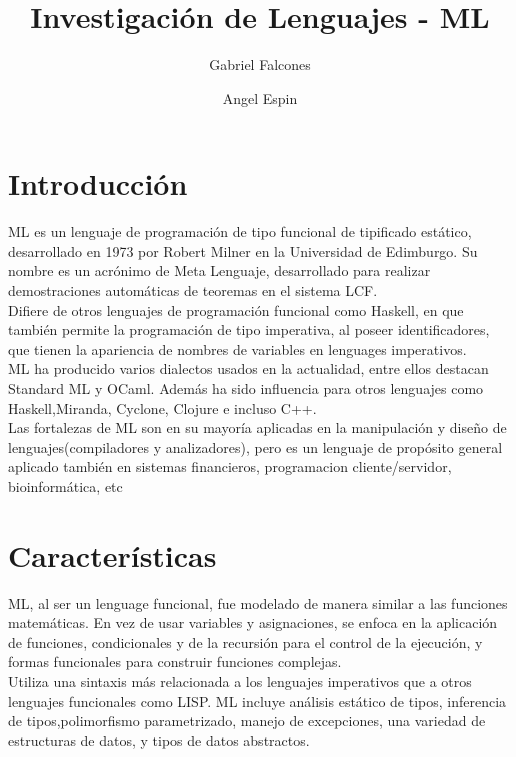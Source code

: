 \documentclass[11pt]{article} %
\title{\color{red}Investigación de Lenguajes - ML}
\author{Gabriel Falcones\and Angel Espin}
\begin{document}
\maketitle


\section{\color{red}Introducción}
ML es un lenguaje de programación de tipo funcional de tipificado estático, desarrollado en 1973 por Robert Milner en la Universidad de Edimburgo. Su nombre es un acrónimo de Meta Lenguaje, desarrollado para realizar demostraciones automáticas de teoremas en el sistema LCF.\\

Difiere de otros lenguajes de programación funcional como Haskell, en que también permite la programación de tipo imperativa, al poseer identificadores, que tienen la apariencia de nombres de variables en lenguages imperativos.\\

ML ha producido varios dialectos usados en la actualidad, entre ellos destacan Standard ML y OCaml. Además ha sido influencia para otros lenguajes como Haskell,Miranda, Cyclone, Clojure e incluso C++.\\

Las fortalezas de ML son en su mayoría aplicadas en la manipulación y diseño de lenguajes(compiladores y analizadores), pero es un lenguaje de propósito general aplicado también en sistemas financieros, programacion cliente/servidor, bioinformática, etc
  

\section{\color{red}Características}
ML, al ser un lenguage funcional, fue modelado de manera similar a las funciones matemáticas. En vez de usar variables y asignaciones, se enfoca en la aplicación de funciones, condicionales y de la recursión para el control de la ejecución, y formas funcionales para construir funciones complejas.\\
 
Utiliza una sintaxis más relacionada a los lenguajes imperativos que a otros lenguajes funcionales como LISP.
ML incluye análisis estático de tipos, inferencia de tipos,polimorfismo parametrizado, manejo de excepciones, una variedad de estructuras de datos, y tipos de datos abstractos.\\
\end{document}
